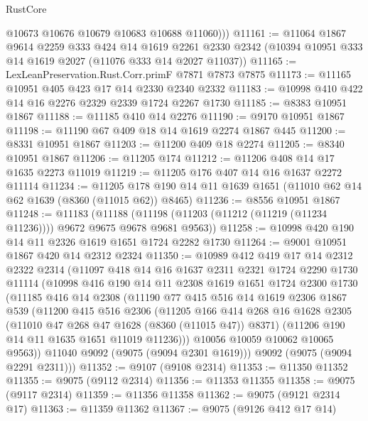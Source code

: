\begin{lexlean}{RustCore}
\begin{coremodule}
          @10673
          @10676
          @10679
          @10683
          @10688
          @11060)))
@11161 := @11064
    @1867
    @9614
    @2259
    @333
    @424
    @14
    @1619
    @2261
    @2330
    @2342
    (@10394 @10951 @333 @14 @1619 @2027 (@11076 @333 @14 @2027 @11037))
@11165 := LexLeanPreservation.Rust.Corr.primF @7871 @7873 @7875
@11173 := @11165 @10951 @405 @423 @17 @14 @2330 @2340 @2332
@11183 := @10998 @410 @422 @14 @16 @2276 @2329 @2339 @1724 @2267 @1730
@11185 := @8383 @10951 @1867
@11188 := @11185 @410 @14 @2276
@11190 := @9170 @10951 @1867
@11198 := @11190 @67 @409 @18 @14 @1619 @2274 @1867 @445
@11200 := @8331 @10951 @1867
@11203 := @11200 @409 @18 @2274
@11205 := @8340 @10951 @1867
@11206 := @11205 @174
@11212 := @11206 @408 @14 @17 @1635 @2273 @11019
@11219 := @11205 @176 @407 @14 @16 @1637 @2272 @11114
@11234 := @11205 @178 @190 @14 @11 @1639 @1651 (@11010 @62 @14 @62 @1639 (@8360 (@11015 @62)) @8465)
@11236 := @8556 @10951 @1867
@11248 := @11183
    (@11188 (@11198 (@11203 (@11212 (@11219 (@11234 @11236)))) @9672 @9675 @9678 @9681 @9563))
@11258 := @10998 @420 @190 @14 @11 @2326 @1619 @1651 @1724 @2282 @1730
@11264 := @9001 @10951 @1867 @420 @14 @2312 @2324
@11350 := @10989
    @412
    @419
    @17
    @14
    @2312
    @2322
    @2314
    (@11097
      @418
      @14
      @16
      @1637
      @2311
      @2321
      @1724
      @2290
      @1730
      @11114
      (@10998
        @416
        @190
        @14
        @11
        @2308
        @1619
        @1651
        @1724
        @2300
        @1730
        (@11185
          @416
          @14
          @2308
          (@11190
            @77
            @415
            @516
            @14
            @1619
            @2306
            @1867
            @539
            (@11200
              @415
              @516
              @2306
              (@11205
                @166
                @414
                @268
                @16
                @1628
                @2305
                (@11010 @47 @268 @47 @1628 (@8360 (@11015 @47)) @8371)
                (@11206 @190 @14 @11 @1635 @1651 @11019 @11236)))
            @10056
            @10059
            @10062
            @10065
            @9563))
        @11040
        @9092
        (@9075 (@9094 @2301 @1619)))
      @9092
      (@9075 (@9094 @2291 @2311)))
@11352 := @9107 (@9108 @2314)
@11353 := @11350 @11352
@11355 := @9075 (@9112 @2314)
@11356 := @11353 @11355
@11358 := @9075 (@9117 @2314)
@11359 := @11356 @11358
@11362 := @9075 (@9121 @2314 @17)
@11363 := @11359 @11362
@11367 := @9075 (@9126 @412 @17 @14)

\end{coremodule}
\end{lexlean}

